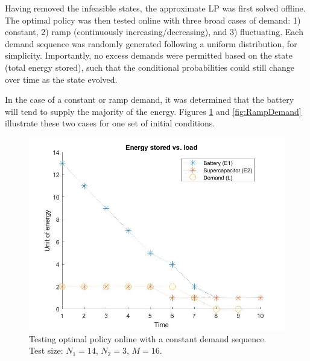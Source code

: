 \documentclass[conference]{IEEEtran}
\begin{document}
Having removed the infeasible states, the approximate LP was first solved offline. The optimal policy was then tested online with three broad cases of demand: 1) constant, 2) ramp (continuously increasing/decreasing), and 3) fluctuating. Each demand sequence was randomly generated following a uniform distribution, for simplicity. Importantly, no excess demands were permitted based on the state (total energy stored), such that the conditional probabilities could still change over time as the state evolved.

In the case of a constant or ramp demand, it was determined that the battery will tend to supply the majority of the energy. Figures \ref{fig:ConstDemand} and \ref{fig:RampDemand} illustrate these two cases for one set of initial conditions.
\begin{figure}[htbp]
\centerline{\includegraphics[scale=0.25]{EnergyStoredvsload_ConstantLoad(E1_max=13,E2_max=2).jpg}}
\caption{Testing optimal policy online with a constant demand sequence. Test size: $N_{1}=14$, $N_{2}=3$, $M=16$.}
\label{fig:ConstDemand}
\end{figure}
\end{document}
